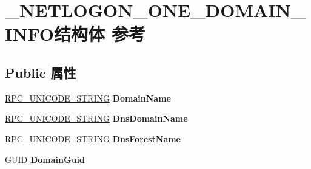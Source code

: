 \hypertarget{struct___n_e_t_l_o_g_o_n___o_n_e___d_o_m_a_i_n___i_n_f_o}{}\section{\+\_\+\+N\+E\+T\+L\+O\+G\+O\+N\+\_\+\+O\+N\+E\+\_\+\+D\+O\+M\+A\+I\+N\+\_\+\+I\+N\+F\+O结构体 参考}
\label{struct___n_e_t_l_o_g_o_n___o_n_e___d_o_m_a_i_n___i_n_f_o}
\subsection*{Public 属性}
\begin{DoxyCompactItemize}
\item 
\mbox{\label{struct___n_e_t_l_o_g_o_n___o_n_e___d_o_m_a_i_n___i_n_f_o_a617c2f3a1f33a1e76e881716f4719e2a}} 
\hyperlink{struct___r_p_c___u_n_i_c_o_d_e___s_t_r_i_n_g}{R\+P\+C\+\_\+\+U\+N\+I\+C\+O\+D\+E\+\_\+\+S\+T\+R\+I\+NG} {\bfseries Domain\+Name}
\item 
\mbox{\label{struct___n_e_t_l_o_g_o_n___o_n_e___d_o_m_a_i_n___i_n_f_o_a1ab28cdab11f95ea9fb8b79eac2b5c83}} 
\hyperlink{struct___r_p_c___u_n_i_c_o_d_e___s_t_r_i_n_g}{R\+P\+C\+\_\+\+U\+N\+I\+C\+O\+D\+E\+\_\+\+S\+T\+R\+I\+NG} {\bfseries Dns\+Domain\+Name}
\item 
\mbox{\label{struct___n_e_t_l_o_g_o_n___o_n_e___d_o_m_a_i_n___i_n_f_o_aea7447ce312e06427369a7ad8446fba5}} 
\hyperlink{struct___r_p_c___u_n_i_c_o_d_e___s_t_r_i_n_g}{R\+P\+C\+\_\+\+U\+N\+I\+C\+O\+D\+E\+\_\+\+S\+T\+R\+I\+NG} {\bfseries Dns\+Forest\+Name}
\item 
\mbox{\label{struct___n_e_t_l_o_g_o_n___o_n_e___d_o_m_a_i_n___i_n_f_o_ad35f8e4961f12b69d5bcb84c6b93dd45}} 
\hyperlink{interface_g_u_i_d}{G\+U\+ID} {\bfseries Domain\+Guid}
\item 
\mbox{\label{struct___n_e_t_l_o_g_o_n___o_n_e___d_o_m_a_i_n___i_n_f_o_ad9aee1f15f9c3016bfd52044a2b16a14}} 

\end{DoxyCompactItemize}
